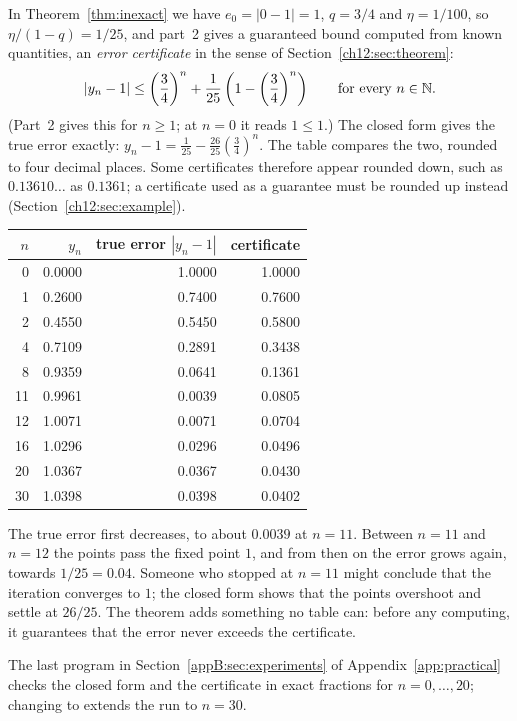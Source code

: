 In Theorem~\ref{thm:inexact} we have $e_0=|0-1|=1$, $q=3/4$ and $\eta=1/100$, so $\eta/(1-q)=1/25$, and part~2 gives a guaranteed bound computed from known quantities, an \emph{error certificate} in the sense of Section~\ref{ch12:sec:theorem}:
\[
 \left|y_n-1\right|\le
 \left(\frac34\right)^n+
 \frac1{25}\left(1-\left(\frac34\right)^n\right)\qquad\text{for every }n\in\mathbb N.
\]
(Part~2 gives this for $n\ge1$; at $n=0$ it reads $1\le1$.) The closed form gives the true error exactly: $y_n-1=\frac1{25}-\frac{26}{25}\left(\frac34\right)^n$. The table compares the two, rounded to four decimal places. Some certificates therefore appear rounded down, such as $0.13610\ldots$ as $0.1361$; a certificate used as a guarantee must be rounded up instead (Section~\ref{ch12:sec:example}).
\begin{center}
\begin{tabular}{@{}rrrr@{}}\toprule
$n$ & $y_n$ & true error $|y_n-1|$ & certificate\\\midrule
0 & 0.0000 & 1.0000 & 1.0000\\
1 & 0.2600 & 0.7400 & 0.7600\\
2 & 0.4550 & 0.5450 & 0.5800\\
4 & 0.7109 & 0.2891 & 0.3438\\
8 & 0.9359 & 0.0641 & 0.1361\\
11 & 0.9961 & 0.0039 & 0.0805\\
12 & 1.0071 & 0.0071 & 0.0704\\
16 & 1.0296 & 0.0296 & 0.0496\\
20 & 1.0367 & 0.0367 & 0.0430\\
30 & 1.0398 & 0.0398 & 0.0402\\\bottomrule
\end{tabular}
\end{center}
The true error first decreases, to about $0.0039$ at $n=11$. Between $n=11$ and $n=12$ the points pass the fixed point $1$, and from then on the error grows again, towards $1/25=0.04$. Someone who stopped at $n=11$ might conclude that the iteration converges to $1$; the closed form shows that the points overshoot and settle at $26/25$. The theorem adds something no table can: before any computing, it guarantees that the error never exceeds the certificate.

The last program in Section~\ref{appB:sec:experiments} of Appendix~\ref{app:practical} checks the closed form and the certificate in exact fractions for $n=0,\ldots,20$; changing  to  extends the run to $n=30$.

